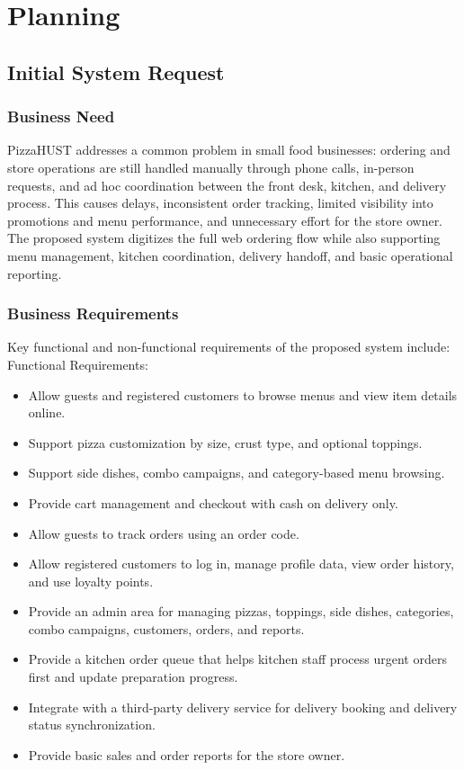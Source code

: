 \section{Planning}

\subsection{Initial System Request}

\subsubsection{Business Need}

PizzaHUST addresses a common problem in small food businesses: ordering and store operations are still handled manually through phone calls, in-person requests, and ad hoc coordination between the front desk, kitchen, and delivery process. This causes delays, inconsistent order tracking, limited visibility into promotions and menu performance, and unnecessary effort for the store owner. The proposed system digitizes the full web ordering flow while also supporting menu management, kitchen coordination, delivery handoff, and basic operational reporting.

\subsubsection{Business Requirements}

Key functional and non-functional requirements of the proposed system include: \\
Functional Requirements:
\begin{itemize}
    \item Allow guests and registered customers to browse menus and view item details online.
    \item Support pizza customization by size, crust type, and optional toppings.
    \item Support side dishes, combo campaigns, and category-based menu browsing.
    \item Provide cart management and checkout with cash on delivery only.
    \item Allow guests to track orders using an order code.
    \item Allow registered customers to log in, manage profile data, view order history, and use loyalty points.
    \item Provide an admin area for managing pizzas, toppings, side dishes, categories, combo campaigns, customers, orders, and reports.
    \item Provide a kitchen order queue that helps kitchen staff process urgent orders first and update preparation progress.
    \item Integrate with a third-party delivery service for delivery booking and delivery status synchronization.
    \item Provide basic sales and order reports for the store owner.
\end{itemize}

